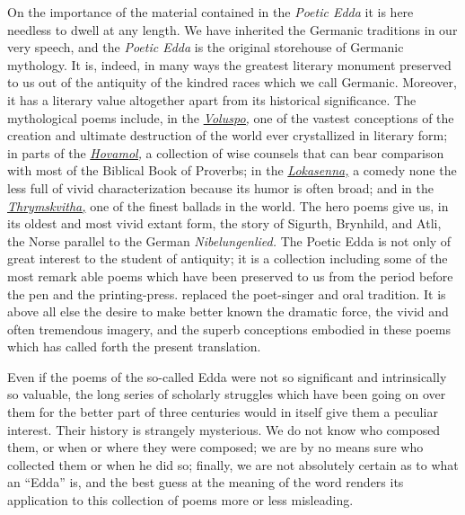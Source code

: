 \documentclass{scrbook}
\newcommand{\chapterref}[1]{\hyperref[cha:#1]{\emph{#1}}}
\begin{document}
On the importance of the material contained in the \emph{Poetic Edda} it is here needless to dwell at any length. We have inherited the Germanic traditions in our very speech, and the \emph{Poetic Edda} is the original storehouse of Germanic mythology. It is, indeed, in many ways the greatest literary monument preserved to us out of the antiquity of the kindred races which we call Germanic. Moreover, it has a literary value altogether apart from its historical significance. The mythological poems include, in the \chapterref{Voluspo,} one of the vastest conceptions of the creation and ultimate destruction of the world ever crystallized in literary form; in parts of the \chapterref{Hovamol,} a collection of wise counsels that can bear comparison with most of the Biblical Book of Proverbs; in the \chapterref{Lokasenna,} a comedy none the less full of vivid characterization because its humor is often broad; and in the \chapterref{Thrymskvitha,} one of the finest ballads in the world. The hero poems give us, in its oldest and most vivid extant form, the story of Sigurth, Brynhild, and Atli, the Norse parallel to the German \emph{Nibelungenlied.} The Poetic Edda is not only of great interest to the student of antiquity; it is a collection including some of the most remark able poems which have been preserved to us from the period before the pen and the printing-press. replaced the poet-singer and oral tradition. It is above all else the desire to make better known the dramatic force, the vivid and often tremendous imagery, and the superb conceptions embodied in these poems which has called forth the present translation.


Even if the poems of the so-called Edda were not so significant and intrinsically so valuable, the long series of scholarly struggles which have been going on over them for the better part of three centuries would in itself give them a peculiar interest. Their history is strangely mysterious. We do not know who composed them, or when or where they were composed; we are by no means sure who collected them or when he did so; finally, we are not absolutely certain as to what an ``Edda'' is, and the best guess at the meaning of the word renders its application to this collection of poems more or less misleading.
\end{document}

